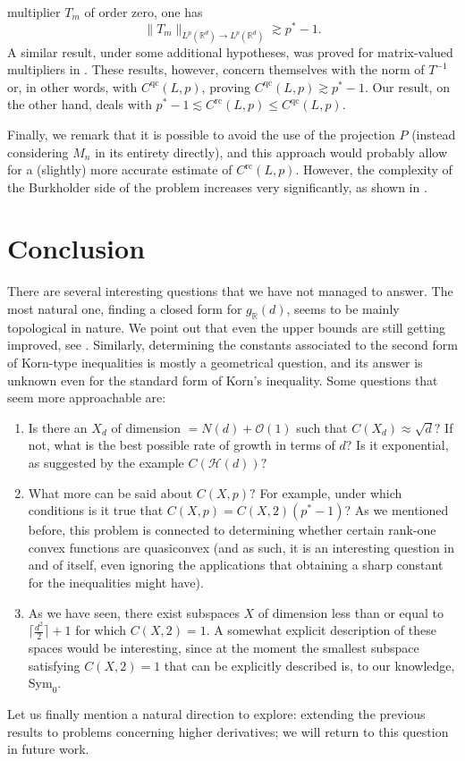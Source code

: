 \documentclass[11pt, a4paper, reqno]{elsarticle}
\theoremstyle{definition}
\theoremstyle{remark}
\begin{document}
multiplier $T_m$ of order zero, one has
\begin{equation*}
\|T_m\|_{L^p(\mathbb{R}^d)\to L^p(\mathbb{R}^d)}\gtrsim p^*-1.
\end{equation*}
A similar result, under some additional
hypotheses, was proved for matrix-valued
multipliers in \cite[Theorem 14]{boros2011}.
These results, however, concern
themselves with the norm of $T^{-1}$ or, 
in other words, with 
$C^{\mathrm{qc}}(L,p)$, proving $C^{\mathrm{qc}}(L,p)
\gtrsim p^*-1$. Our result, on the other hand, deals with 
$p^*-1\lesssim C^{\mathrm{rc}}(L,p)\le C^{\mathrm{qc}}(L,p).$\par
Finally, we remark that it is possible to avoid the use
of the projection $P$ (instead considering $M_n$ in its entirety 
directly), and this approach
would probably allow for a (slightly) more accurate
estimate of $C^{\mathrm{rc}}(L,p)$. However, the 
complexity of the Burkholder side of the problem increases very 
significantly, as shown in \cite{Ivanisvili2015InequalityTransform}.
\section{Conclusion}
There are several interesting questions that we
have not managed to answer. 
The most natural one, finding
a closed form for $g_{\mathbb R}(d)$,
seems to be mainly topological in nature. We point out that even the
upper bounds are still getting improved,
see \cite{DominguezLam2021}.
Similarly, determining the constants associated
to the second form of Korn-type inequalities is
mostly a geometrical question,
and its answer is unknown even for the standard 
form of Korn's inequality.
Some questions that seem more approachable are:
\begin{enumerate}
    \item
    Is there an $X_d$ of dimension $= N(d)+\mathcal O(1)$
    such that 
    $C(X_d)\approx \sqrt d?$
    If not, what is the best possible rate of growth in terms of 
    $d$? Is it exponential,
    as suggested by the example $C(\mathcal H(d))?$
    \item What more can be said about $C(X,p)?$
    For example, under which conditions 
    is it true that $C(X,p)=C(X,2)(p^*-1)$?
    As we mentioned before, this problem 
    is connected to determining whether
    certain rank-one convex 
    functions are quasiconvex
    (and as such, it is an interesting question in and of 
    itself, even ignoring
    the applications that
    obtaining a sharp constant for the 
    inequalities might have).
    \item As we have seen, there
    exist subspaces $X$ of dimension 
    less than or equal to $\lceil \frac{d^2}2\rceil+1$ 
    for which $C(X,2)=1.$ A somewhat
    explicit description of these
    spaces would be interesting, 
    since at the moment the smallest subspace satisfying $C(X,2)=1$
    that can be explicitly described
    is, to our knowledge, $\mathrm{Sym}_0.$
\end{enumerate}
Let us finally mention a natural direction to explore:
extending the previous results to problems
concerning higher derivatives; we will return to this
question in future work.
\end{document}

